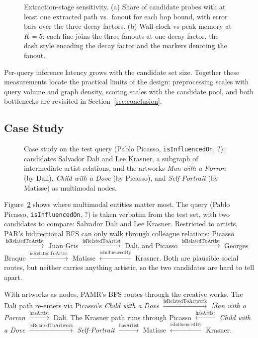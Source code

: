 \documentclass[runningheads]{llncs}
\begin{document}
\begin{figure}[t]
  \centering
  
  \caption{Extraction-stage sensitivity. (a) Share of candidate probes
    with at least one extracted path vs.\ fanout for each hop bound,
    with error bars over the three decay factors. (b) Wall-clock vs
    peak memory at $K = 5$: each line joins the three fanouts at one
  decay factor, the dash style encoding the decay factor and the
  markers denoting the fanout.}
  \label{fig:bfs-sweep}
\end{figure}

Per-query inference latency grows with the candidate set size. Together these
measurements locate the practical limits of the design: preprocessing scales
with query volume and graph density, scoring scales with the candidate
pool, and both bottlenecks are revisited in
Section~\ref{sec:conclusion}.

\subsection{Case Study}
\label{sec:case-study}

\begin{figure}[t]
  \centering
  
  \caption{Case study on the test query (Pablo Picasso,
    \texttt{isInfluencedOn}, ?): candidates Salvador Dali and
    Lee Krasner, a subgraph of intermediate artist relations, and
    the artworks \textit{Man with a Porron} (by Dali),
    \textit{Child with a Dove} (by Picasso), and \textit{Self-Portrait}
  (by Matisse) as multimodal nodes.}
  \label{fig:case-study}
\end{figure}

Figure~\ref{fig:case-study} shows where multimodal entities matter
most. The query (Pablo Picasso, \texttt{isInfluencedOn}, ?) is taken
verbatim from the test set, with two candidates to compare: Salvador
Dali and Lee Krasner. Restricted to artists, PAR's bidirectional BFS
can only walk through colleague relations: Picasso $\xrightarrow{\text{isRelatedToArtist}}$ Juan Gris $\xrightarrow{\text{isRelatedToArtist}}$ Dali, and Picasso $\xrightarrow{\text{isRelatedToArtist}}$ Georges Braque $\xrightarrow{\text{isRelatedToArtist}}$ Matisse $\xleftarrow{\text{isInfluencedBy}}$ Krasner. Both are plausible social routes, but neither carries anything artistic, so the two candidates are hard to tell apart.

With artworks as nodes, PAMR's BFS routes through the creative works. The Dali path re-enters via Picasso's \textit{Child with a Dove} $\xrightarrow{\text{isRelatedToArtwork}}$ \textit{Man with a Porron} $\xrightarrow{\text{hasArtist}}$ Dali. The Krasner path runs through Picasso $\xleftarrow{\text{hasArtist}}$ \textit{Child with a Dove} $\xrightarrow{\text{isRelatedToArtwork}}$ \textit{Self-Portrait} $\xrightarrow{\text{hasArtist}}$ Matisse $\xleftarrow{\text{isInfluencedBy}}$ Krasner.
\end{document}
